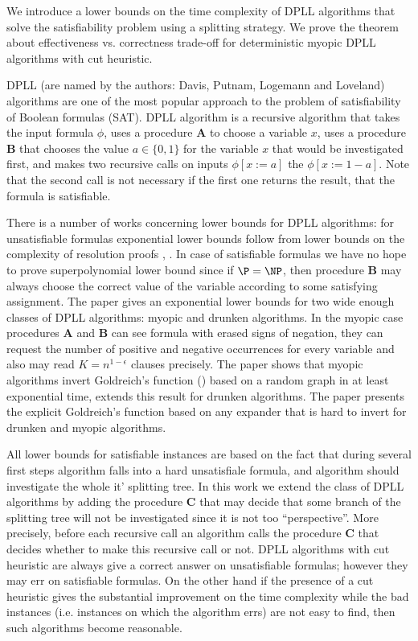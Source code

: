 We introduce a lower bounds on the time complexity of DPLL
algorithms that solve the satisfiability problem using a splitting
strategy. We prove the theorem about effectiveness vs. correctness
trade-off for deterministic myopic DPLL algorithms with cut heuristic.

DPLL (are named by the authors: Davis, Putnam, Logemann and Loveland)
algorithms are one of the most popular approach to the problem of
satisfiability of Boolean formulas (SAT). DPLL algorithm is a
recursive algorithm that takes the input formula $\phi$, uses a
procedure $\mathbf{A}$ to choose a variable $x$, uses a procedure
$\mathbf{B}$ that chooses the value $a \in \{0, 1\}$ for the variable
$x$ that would be investigated first, and makes two recursive calls on
inputs $\phi[x := a]$ the $\phi[x := 1 - a]$.  Note that the second
call is not necessary if the first one returns the result, that the
formula is satisfiable.

There is a number of works concerning lower bounds for DPLL
algorithms: for unsatisfiable formulas exponential lower bounds follow
from lower bounds on the complexity of resolution proofs \cite{Urq87},
\cite{Tse68}. In case of satisfiable formulas we have no hope to prove
superpolynomial lower bound since if $\P = \NP$, then procedure
$\mathbf{B}$ may always choose the correct value of the variable
according to some satisfying assignment. The paper \cite{AHI05} gives
an exponential lower bounds for two wide enough classes of DPLL
algorithms: myopic and drunken algorithms.  In the myopic case
procedures $\mathbf{A}$ and $\mathbf{B}$ can see formula with erased
signs of negation, they can request the number of positive and
negative occurrences for every variable and also may read $K = n^{1 -
\epsilon}$ clauses precisely.  The paper \cite{CEMT09} shows that
myopic algorithms invert Goldreich's function (\cite{Gol00}) based on
a random graph in at least exponential time, \cite{I10} extends this
result for drunken algorithms.  The paper \cite{IS11} presents the
explicit Goldreich's function based on any expander that is hard to
invert for drunken and myopic algorithms.

All lower bounds for satisfiable instances are based on the fact that
during several first steps algorithm falls into a hard unsatisfiale
formula, and algorithm should investigate the whole it' splitting
tree.  In this work we extend the class of DPLL algorithms by adding
the procedure $\mathbf{C}$ that may decide that some branch of the
splitting tree will not be investigated since it is not too
``perspective''.  More precisely, before each recursive call an
algorithm calls the procedure $\mathbf{C}$ that decides whether to
make this recursive call or not.  DPLL algorithms with cut heuristic
are always give a correct answer on unsatisfiable formulas; however
they may err on satisfiable formulas. On the other hand if the
presence of a cut heuristic gives the substantial improvement on the
time complexity while the bad instances (i.e. instances on which the
algorithm errs) are not easy to find, then such algorithms become
reasonable.


